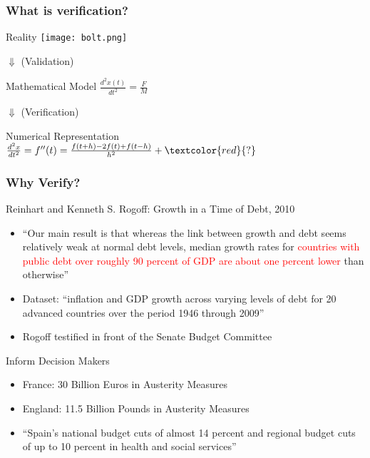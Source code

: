 \documentclass[mathserif]{beamer}
\begin{document}
\begin{frame}
 \frametitle{What is verification?}

 \begin{center}
  \center
      \begin{block}{Reality}
       \center
       \texttt{[image: bolt.png]}\\
       \end{block}
  $\Downarrow$ (Validation)
      \begin{block}{Mathematical Model}
       \center
       $\frac{d^2x(t)}{dt^2} = \frac{F}{M}$\\
      \end{block}
  $\Downarrow$ (Verification)
  \begin{block}{Numerical Representation}
   \center
   $\frac{d^2x}{dt^2} = f''(t) = \frac{f(t+h) - 2 f(t) + f(t-h)}{h^2} + \textcolor{red}{?}$
   \end{block}
 \end{center}
\end{frame}

\begin{frame}
  \frametitle{Why Verify?}
  \begin{block}{Reinhart and Kenneth S. Rogoff: Growth in a Time of Debt, 2010}
    \begin{itemize}
    \item ``Our main result is that whereas the link between growth and
	  debt seems relatively weak at normal debt levels, median
	  growth rates for  \textcolor{red}{countries with public debt
	  over roughly 90 percent of GDP are about one percent lower}
	  than otherwise'' 
     \item Dataset: ``inflation and GDP growth across varying levels
	   of debt for 20 advanced countries over the period 1946
	   through 2009''
     \item Rogoff testified in front of the Senate Budget Committee 
   \end{itemize}
  \end{block}
  \begin{block}{Inform Decision Makers}
    \begin{itemize}
     \item France: 30 Billion Euros in Austerity Measures
     \item England: 11.5 Billion Pounds in Austerity Measures
     \item ``Spain's national budget cuts of almost 14 percent
	   and regional budget cuts of up to 10 percent in health and
	   social services''
    \end{itemize}
  \end{block}
 
\end{frame}
\end{document}
